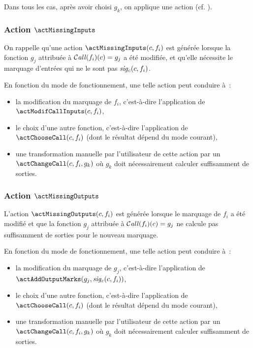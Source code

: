 Dans tous les cas, après avoir choisi $g_k$, 
on applique une action \actChangeCall (cf. ).

\subsubsection{Action $\actMissingInputs$}

On rappelle qu'une action $\actMissingInputs(c, f_i)$ est générée lorsque la
fonction $g_j$ attribuée à $\operatorname{\mathcal{C\mathit{all}}}(f_i)(c) = g_j$ a été modifiée, et qu'elle
nécessite le marquage d'entrées qui ne le sont pas $\mathit{sig_c}(c,f_i)$.
\bb

En fonction du mode de fonctionnement, une telle action peut conduire à~:
\begin{itemize}
  \item la modification du marquage de $f_i$, 
    c'est-à-dire l'application de $\actModifCallInputs(c, f_i)$,
  \item le choix d'une autre fonction, c'est-à-dire l'application de
    $\actChooseCall(c, f_i)$ (dont le résultat dépend du mode courant),
  \item une transformation manuelle par l'utilisateur de cette action par 
    un $\actChangeCall(c, f_i, g_k)$ où $g_k$ doit nécessairement calculer
    suffisamment de sorties.
\end{itemize}

\subsubsection{Action $\actMissingOutputs$}

L'action $\actMissingOutputs(c, f_i)$ est générée lorsque le marquage de $f_i$
a été modifié et que la
fonction $g_j$ attribuée à $\operatorname{\mathcal{C\mathit{all}}}(f_i)(c) = g_j$ ne calcule pas suffisamment 
de sorties pour le nouveau marquage.
\bb

En fonction du mode de fonctionnement, une telle action peut conduire à~:
\begin{itemize}
  \item la modification du marquage de $g_j$,
    c'est-à-dire l'application de $\actAddOutputMarks(g_j, \sigc(c, f_i))$,
  \item le choix d'une autre fonction, c'est-à-dire l'application de
    $\actChooseCall(c, f_i)$ (dont le résultat dépend du mode courant),
  \item une transformation manuelle par l'utilisateur de cette action par
    un $\actChangeCall(c, f_i, g_k)$ où $g_k$ doit nécessairement calculer
    suffisamment de sorties.
\end{itemize}

